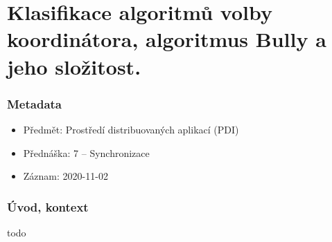 

\chapter{Klasifikace algoritmů volby koordinátora, algoritmus Bully a jeho složitost.}

\subsection{Metadata}

\begin{itemize}
    \item Předmět: Prostředí distribuovaných aplikací (PDI)
    \item Přednáška: 7 -- Synchronizace
    \item Záznam: 2020-11-02
\end{itemize}

\subsection{Úvod, kontext}

todo
